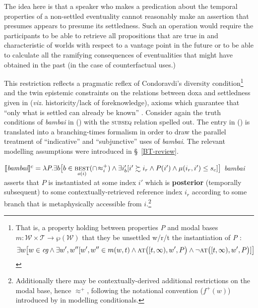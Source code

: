 The idea here is that a speaker who makes a predication about the temporal properties of a non-settled eventuality cannot reasonably make an assertion that presumes appears to presume its settledness.
Such an operation would require the participants to be able to retrieve all propositions that are true in and characteristic of worlds with respect to a vantage point in the future or to be able to calculate all the ramifying consequences of eventualities that might have obtained in the past (in the case of counterfactual uses.)


This restriction reflects a pragmatic reflex of Condoravdi's \citeyearpar[83]{Condoravdi2002}  diversity condition\footnote{That is, a property holding between properties \textit{P} and modal bases $ m:\mathcal{W\times T\to\wp(\mathcal W)} $ that they be unsettled w/r/t the instantiation of \textit{P} \citep[83]{Condoravdi2002}:
$$\exists w\big[w\in\textit{cg}\wedge\exists w',w''[w',w''\in m(w,t)\wedge\textsc{at}\big([t,\infty),w',P\big)\wedge\neg \textsc{at}\big([t,\infty),w',P\big)]\big]$$} and the twin epistemic constraints on the relations between doxa and settledness given in \citealt{Kaufmann2002,Kaufmann2005,Kaufmann2006} (\textit{viz.} historicity/lack of foreknowledge), axioms which guarantee that ``only what is settled can already be known'' \citep[101]{Kaufmann2006}. Consider again the truth conditions of \textit{bambai} in () with the \textsc{subseq} relation spelled out. The entry in () is translated into a branching-times formalism in order to draw the parallel treatment of ``indicative'' and ``subjunctive'' uses of \textit{bambai}. The relevant modelling assumptions were introduced in \S~\ref{BT-review}.

\pex{}
$ \denote[c]{\textit{bambai}}=\lambda\textit{P}.\exists b
\big[b\in\underset{o(i)}{\textsc{best}}(\cap\!\approx_i^+)\wedge \exists i'_b[i'\succsim i_r\wedge P(i')\wedge\mu(i_r,i')\leq s_c]\big] $
\textit{bambai} asserts that $ \mathit P $ is instantiated at some index $ i' $ which is \textbf{posterior} (temporally subsequent) to some contextually-retrieved reference index $ i_r $ according to some branch that is metaphysically accessible from $ i $.\footnote{Additionally there may be contextually-derived additional restrictions on the modal base, hence $ \boldsymbol{\approx^+} $, following the notational convention ($ f^+(w) $) introduced by \citet{Kratzer1981} in modelling conditionals.}

\xe

